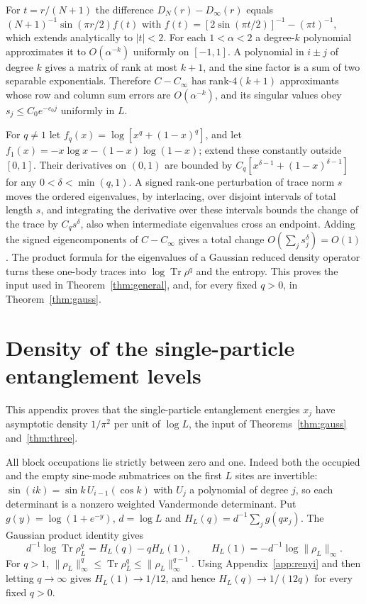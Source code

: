 \documentclass[11pt,a4paper]{article}
\theoremstyle{remark}
\newcommand{\Tr}{\operatorname{Tr}}
\begin{document}
For $t=r/(N+1)$ the difference $D_N(r)-D_\infty(r)$ equals $(N+1)^{-1}\sin(\pi r/2) f(t)$ with $f(t)=[2\sin(\pi t/2)]^{-1}-(\pi t)^{-1}$, which extends analytically to $|t|<2$. For each $1<\alpha<2$ a degree-$k$ polynomial approximates it to $O(\alpha^{-k})$ uniformly on $[-1,1]$. A polynomial in $i\pm j$ of degree $k$ gives a matrix of rank at most $k+1$, and the sine factor is a sum of two separable exponentials. Therefore $C-C_\infty$ has rank-$4(k+1)$ approximants whose row and column sum errors are $O(\alpha^{-k})$, and its singular values obey $s_j\le C_0e^{-c_0j}$ uniformly in $L$.

For $q\ne1$ let $f_q(x)=\log[x^q+(1-x)^q]$, and let $f_1(x)=-x\log x-(1-x)\log(1-x)$; extend these constantly outside $[0,1]$. Their derivatives on $(0,1)$ are bounded by $C_q[x^{\delta-1}+(1-x)^{\delta-1}]$ for any $0<\delta<\min(q,1)$. A signed rank-one perturbation of trace norm $s$ moves the ordered eigenvalues, by interlacing, over disjoint intervals of total length $s$, and integrating the derivative over these intervals bounds the change of the trace by $C_q s^\delta$, also when intermediate eigenvalues cross an endpoint. Adding the signed eigencomponents of $C-C_\infty$ gives a total change $O(\sum_j s_j^\delta)=O(1)$. The product formula for the eigenvalues of a Gaussian reduced density operator turns these one-body traces into $\log\Tr\rho^q$ and the entropy. This proves the input used in Theorem~\ref{thm:general}, and, for every fixed $q>0$, in Theorem~\ref{thm:gauss}.

\section{Density of the single-particle entanglement levels}\label{app:modular}
This appendix proves that the single-particle entanglement energies $x_j$ have asymptotic density $1/\pi^2$ per unit of $\log L$, the input of Theorems~\ref{thm:gauss} and~\ref{thm:three}.

All block occupations lie strictly between zero and one. Indeed both the occupied and the empty sine-mode submatrices on the first $L$ sites are invertible: $\sin(i k)=\sin k\,U_{i-1}(\cos k)$ with $U_j$ a polynomial of degree $j$, so each determinant is a nonzero weighted Vandermonde determinant. Put $g(y)=\log(1+e^{-y})$, $d=\log L$ and $H_L(q)=d^{-1}\sum_jg(qx_j)$. The Gaussian product identity gives
\[
 d^{-1}\log\Tr\rho_L^q=H_L(q)-qH_L(1),\qquad H_L(1)=-d^{-1}\log\|\rho_L\|_\infty .
\]
For $q>1$, $\|\rho_L\|_\infty^q\le\Tr\rho_L^q\le\|\rho_L\|_\infty^{q-1}$. Using Appendix~\ref{app:renyi} and then letting $q\to\infty$ gives $H_L(1)\to1/12$, and hence $H_L(q)\to 1/(12q)$ for every fixed $q>0$.
\end{document}
